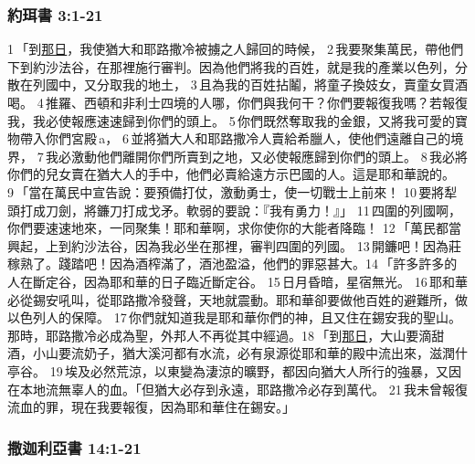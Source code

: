 \subsubsection{約珥書 3:1-21}
1 「到\underline{那日}，我使猶大和耶路撒冷被擄之人歸回的時候， 2 我要聚集萬民，帶他們下到約沙法谷，在那裡施行審判。因為他們將我的百姓，就是我的產業以色列，分散在列國中，又分取我的地土， 3 且為我的百姓拈鬮，將童子換妓女，賣童女買酒喝。 4 推羅、西頓和非利士四境的人哪，你們與我何干？你們要報復我嗎？若報復我，我必使報應速速歸到你們的頭上。 5 你們既然奪取我的金銀，又將我可愛的寶物帶入你們宮殿 a， 6 並將猶大人和耶路撒冷人賣給希臘人，使他們遠離自己的境界， 7 我必激動他們離開你們所賣到之地，又必使報應歸到你們的頭上。 8 我必將你們的兒女賣在猶大人的手中，他們必賣給遠方示巴國的人。這是耶和華說的。9 「當在萬民中宣告說：要預備打仗，激動勇士，使一切戰士上前來！ 10 要將犁頭打成刀劍，將鐮刀打成戈矛。軟弱的要說：『我有勇力！』」 11 四圍的列國啊，你們要速速地來，一同聚集！耶和華啊，求你使你的大能者降臨！ 12 「萬民都當興起，上到約沙法谷，因為我必坐在那裡，審判四圍的列國。 13 開鐮吧！因為莊稼熟了。踐踏吧！因為酒榨滿了，酒池盈溢，他們的罪惡甚大。14 「許多許多的人在斷定谷，因為耶和華的日子臨近斷定谷。 15 日月昏暗，星宿無光。 16 耶和華必從錫安吼叫，從耶路撒冷發聲，天地就震動。耶和華卻要做他百姓的避難所，做以色列人的保障。 17 你們就知道我是耶和華你們的神，且又住在錫安我的聖山。那時，耶路撒冷必成為聖，外邦人不再從其中經過。18 「到\underline{那日}，大山要滴甜酒，小山要流奶子，猶大溪河都有水流，必有泉源從耶和華的殿中流出來，滋潤什亭谷。 19 埃及必然荒涼，以東變為淒涼的曠野，都因向猶大人所行的強暴，又因在本地流無辜人的血。「但猶大必存到永遠，耶路撒冷必存到萬代。 21 我未曾報復流血的罪，現在我要報復，因為耶和華住在錫安。」

\subsubsection{撒迦利亞書 14:1-21}

